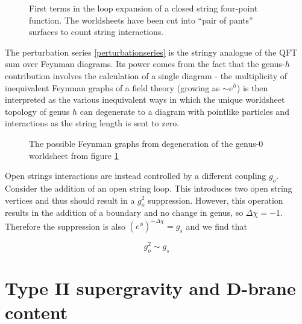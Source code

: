 \begin{figure}[h!]
\centering
\def\svgwidth{300pt}
\captionsetup{width=0.8\textwidth}

\caption{First terms in the loop expansion of a closed string four-point function. The worldsheets have been cut into ``pair of pants'' surfaces to count string interactions.} \label{loopfigure}
\end{figure}


The perturbation series \eqref{perturbationseries} is the stringy analogue of the QFT sum over Feynman diagrams. Its power comes from the fact that the genus-$h$ contribution involves the calculation of a single diagram - the multiplicity of inequivalent Feynman graphs of a field theory (growing as $\sim e^h$) is then interpreted as the various inequivalent ways in which the unique worldsheet topology of genus $h$ can degenerate to a diagram with pointlike particles and interactions as the string length is sent to zero.


\begin{figure}[h!]
\centering
\def\svgwidth{300pt}
\captionsetup{width=0.8\textwidth}

\caption{The possible Feynman graphs from degeneration of the genus-$0$ worldsheet from figure \ref{loopfigure}}
\end{figure}



Open strings interactions are instead controlled by a different coupling $g_o$. Consider the addition of an open string loop. This introduces two open string vertices and thus should result in a $g_o^2$ suppression. However, this operation results in the addition of a boundary and no change in genus, so $\Delta\chi = -1$. Therefore the suppression is also $(e^\phi)^{-\Delta\chi} = g_s$ and we find that

\begin{equation}
	g_o^2 \sim g_s
	\label{}
\end{equation}



\section{Type II supergravity and D-brane content}



